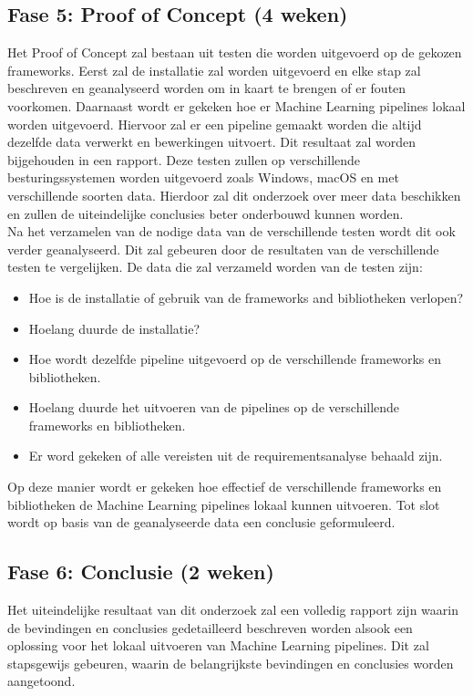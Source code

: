 \subsection{Fase 5: Proof of Concept (4 weken)}
Het Proof of Concept zal bestaan uit testen die worden uitgevoerd op de gekozen frameworks. Eerst zal de installatie zal worden uitgevoerd en elke stap zal beschreven en geanalyseerd worden om in kaart te brengen of er fouten voorkomen. Daarnaast wordt er gekeken hoe er Machine Learning pipelines lokaal worden uitgevoerd. Hiervoor zal er een pipeline gemaakt worden die altijd dezelfde data verwerkt en bewerkingen uitvoert. Dit resultaat zal worden bijgehouden in een rapport.
Deze testen zullen op verschillende besturingssystemen worden uitgevoerd zoals Windows, macOS en met verschillende soorten data. Hierdoor zal dit onderzoek over meer data beschikken en zullen de uiteindelijke conclusies beter onderbouwd kunnen worden.\\
Na het verzamelen van de nodige data van de verschillende testen wordt dit ook verder geanalyseerd. Dit zal gebeuren door de resultaten van de verschillende testen te vergelijken. 
De data die zal verzameld worden van de testen zijn:
\begin{itemize}
  \item Hoe is de installatie of gebruik van de frameworks and bibliotheken verlopen?
  \item Hoelang duurde de installatie?
  \item Hoe wordt dezelfde pipeline uitgevoerd op de verschillende frameworks en bibliotheken.
  \item Hoelang duurde het uitvoeren van de pipelines op de verschillende frameworks en bibliotheken.
  \item Er word gekeken of alle vereisten uit de requirementsanalyse behaald zijn.
\end{itemize}
Op deze manier wordt er gekeken hoe effectief de verschillende frameworks en bibliotheken de Machine Learning pipelines lokaal kunnen uitvoeren. Tot slot wordt op basis van de geanalyseerde data een conclusie geformuleerd.\\
\subsection{Fase 6: Conclusie (2 weken)}
Het uiteindelijke resultaat van dit onderzoek zal een volledig rapport zijn waarin de bevindingen en conclusies gedetailleerd beschreven worden alsook een oplossing voor het lokaal uitvoeren van Machine Learning pipelines. Dit zal stapsgewijs gebeuren, waarin de belangrijkste bevindingen en conclusies worden aangetoond.\\

